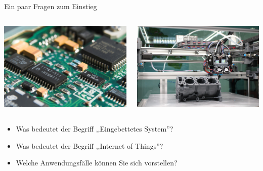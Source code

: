 \begin{frame}{Ein paar Fragen zum Einstieg}
    \begin{columns}
        \begin{column}[b]{.5\textwidth}
            \begin{center}
                \includegraphics[width=\textwidth]{img/iot-hardware}
            \end{center}
        \end{column}
        \begin{column}[b]{.5\textwidth}
            \begin{center}
                \includegraphics[width=\textwidth]{img/iot-mechatronik}
            \end{center}
        \end{column}
    \end{columns}

    \bigskip

    \begin{itemize}
        \item Was bedeutet der Begriff ,,Eingebettetes System''?
        \item Was bedeutet der Begriff ,,Internet of Things''?
        \item Welche Anwendungsfälle können Sie sich vorstellen?
    \end{itemize}
\end{frame}

